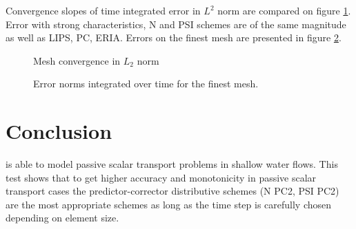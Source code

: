 Convergence slopes of time integrated error in $L^2$ norm are compared on figure \ref{t2d:cone:error_timeintegrals}.
Error with strong characteristics, N and PSI schemes are of the same magnitude as well as 
LIPS, PC, ERIA.
Errors on the finest mesh are presented in figure \ref{t2d:cone:error_timeintegrals_mesh3}.



\begin{figure}[h!]
\centering
{}
\caption{Mesh convergence in $L_2$ norm}
\label{t2d:cone:error_timeintegrals}
\end{figure}

\begin{figure}[H]
\centering
{}
\caption{Error norms integrated over time for the finest mesh.}
\label{t2d:cone:error_timeintegrals_mesh3}
\end{figure}


\section{Conclusion}
 is able to model passive scalar transport problems in shallow water flows. This test shows that to get higher accuracy and monotonicity in passive scalar transport cases the predictor-corrector distributive schemes (N PC2, PSI PC2) are the most appropriate schemes as long as the time step is carefully chosen depending on element size.



